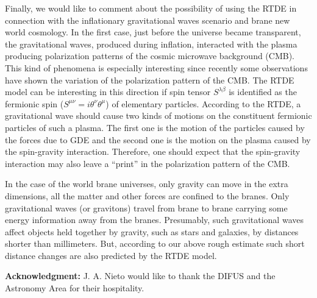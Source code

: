 \documentclass[a4paper,12pt]{article}
\begin{document}
Finally, we would like to comment about the possibility of using the RTDE in
connection with the inflationary gravitational waves scenario and brane new
world cosmology. In the first case, just before the universe became
transparent, the gravitational waves, produced during inflation, interacted
with the plasma producing polarization patterns of the cosmic microwave
background (CMB). This kind of phenomena is especially interesting since
recently some observations have shown the variation of the polarization
pattern of the CMB. The RTDE model can be interesting in this direction if
spin tensor $S^{\lambda \beta }$ is identified as the fermionic spin ($%
S^{\mu \nu }=i\theta ^{\nu }\theta ^{\mu }$) of elementary particles.
According to the RTDE, a gravitational wave should cause two kinds of
motions on the constituent fermionic particles of such a plasma. The first
one is the motion of the particles caused by the forces due to GDE and the
second one is the motion on the plasma caused by the spin-gravity
interaction. Therefore, one should expect that the spin-gravity interaction
may also leave a ``print'' in the polarization pattern of the CMB.

In the case of the world brane universes, only gravity can move in the extra
dimensions, all the matter and other forces are confined to the branes. Only
gravitational waves (or gravitons) travel from brane to brane carrying some
energy information away from the branes. Presumably, such gravitational
waves affect objects held together by gravity, such as stars and galaxies,
by distances shorter than millimeters. But, according to our above rough
estimate such short distance changes are also predicted by the RTDE model.

\bigskip

\textbf{Acknowledgment: }J. A. Nieto would like to thank the DIFUS and the
Astronomy Area for their hospitality.
\end{document}
